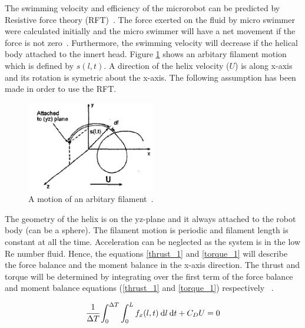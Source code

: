 \documentclass[12pt,a4paper,titlepage]{report}
\begin{document}
The swimming velocity and efficiency of the microrobot can be predicted by Resistive force theory (RFT)~\citep{purcell1997efficiency}. 
The force exerted on the fluid by micro swimmer were calculated initially and the micro swimmer will have a net 
movement if the force is not zero~\citep{Doe:2013:Online}. Furthermore, the swimming velocity will decrease if the helical
body attached to the innert head. Figure \ref{filament} shows an arbitary filament motion which is defined by $s(l,t)$. 
A direction of the helix velocity ($U$) is along x-axis and its rotation is symetric about the x-axis. 
The following assumption has been made in order to use the RFT. 

\begin{figure}
  \begin{center}
    \includegraphics[width=0.5\textwidth]{filament}
  \caption[A motion of helical segment]{A motion of an arbitary filament~\citep{edd2003biomimetic}.}
  \label{filament}
\end{center}
\end{figure}


The geometry
of the helix is on the yz-plane and it always attached to the robot body (can be a sphere). The 
filament motion is periodic and filament length is constant at all the time. Acceleration can be neglected as the
system is in the low Re number fluid. Hence, the equations \ref{thrust_1} and \ref{torque_1} will describe the force balance and 
the moment balance in the x-axis direction. The thrust and torque will be determined by integrating over the 
first term of the force balance and moment balance equations (\ref{thrust_1} and \ref{torque_1}) 
 respectively ~\citep{edd2003biomimetic}.





\begin{equation}
  \cfrac {1} {\Delta T} \int_0^{\Delta T} \int_0^L  f_x(l,t)\: \mathrm{d}l \:\mathrm{d}t + C_DU  = 0
\label{thrust_1}
\end{equation}
\end{document}

